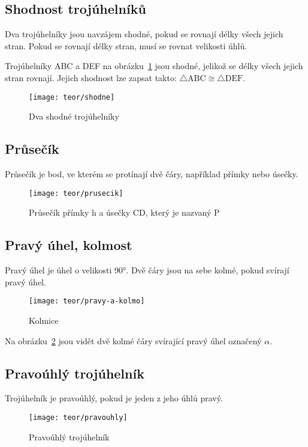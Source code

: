 \subsection{Shodnost trojúhelníků}
Dva trojúhelníky jsou navzájem shodné, pokud se rovnají délky všech jejich stran. Pokud se rovnají délky stran, musí se rovnat velikosti úhlů.

Trojúhelníky ABC a DEF na obrázku~\ref{fig:shodne} jsou shodné, jelikož se délky všech jejich stran rovnají. Jejich shodnost lze zapsat takto: $\triangle\text{ABC} \cong \triangle\text{DEF}$.

\begin{figure}[h]
    \centering
    \texttt{[image: teor/shodne]}
    \caption{Dva shodné trojúhelníky}
    \label{fig:shodne}
\end{figure}
\FloatBarrier

\subsection{Průsečík}
Průsečík je bod, ve kterém se protínají dvě čáry, například přímky nebo úsečky.

\begin{figure}[h]
    \centering
    \texttt{[image: teor/prusecik]}
    \caption{Průsečík přímky h a úsečky CD, který je nazvaný P}
\end{figure}
\FloatBarrier

\subsection{Pravý úhel, kolmost}
Pravý úhel je úhel o velikosti 90°. Dvě čáry jsou na sebe kolmé, pokud svírají pravý úhel.

\begin{figure}[h]
    \centering
    \texttt{[image: teor/pravy-a-kolmo]}
    \caption{Kolmice}
    \label{fig:kolm}
\end{figure}
\FloatBarrier

Na obrázku~\ref{fig:kolm} jsou vidět dvě kolmé čáry svírající pravý úhel označený $\alpha$.

\subsection{Pravoúhlý trojúhelník}
Trojúhelník je pravoúhlý, pokud je jeden z jeho úhlů pravý.

\begin{figure}[!h]
    \centering
    \texttt{[image: teor/pravouhly]}
    \caption{Pravoúhlý trojúhelník}
    \label{fig:pravouhly_troj}
\end{figure}
\FloatBarrier

